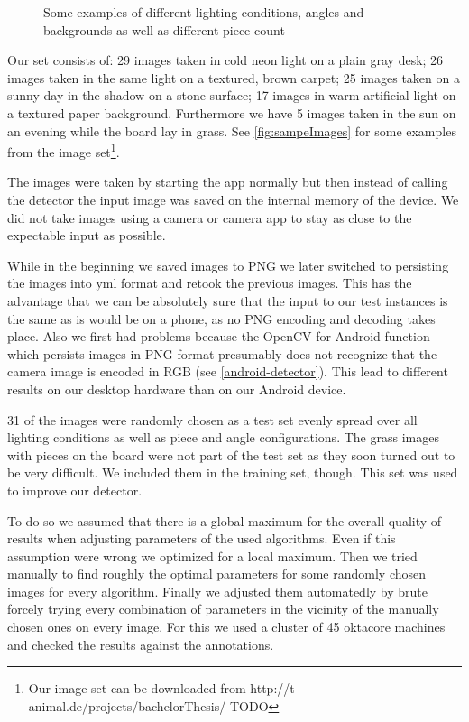 \begin{figure}
		\caption{Some examples of different lighting conditions, angles and backgrounds as well as different piece count}
		\label{fig:sampeImages}
	\end{figure}

	Our set consists of: 29 images taken in cold neon light on a plain gray desk; 26 images taken in the same light on a textured, brown carpet; 25 images taken on a sunny day in the shadow on a stone surface; 17 images in warm artificial light on a textured paper background. Furthermore we have 5 images taken in the sun on an evening while the board lay in grass. See \autoref{fig:sampeImages} for some examples from the image set\footnote{Our image set can be downloaded from http://t-animal.de/projects/bachelorThesis/ TODO}.

	The images were taken by starting the app normally but then instead of calling the detector the input image was saved on the internal memory of the device. We did not take images using a camera or camera app to stay as close to the expectable input as possible.

	While in the beginning we saved images to PNG we later switched to persisting the images into yml format and retook the previous images. This has the advantage that we can be absolutely sure that the input to our test instances is the same as is would be on a phone, as no PNG encoding and decoding takes place. Also we first had problems because the OpenCV for Android function which persists images in PNG format presumably does not recognize that the camera image is encoded in RGB (see \autoref{android-detector}). This lead to different results on our desktop hardware than on our Android device.

	31 of the images were randomly chosen as a test set evenly spread over all lighting conditions as well as piece and angle configurations. The grass images with pieces on the board were not part of the test set as they soon turned out to be very difficult. We included them in the training set, though. This set was used to improve our detector.

	To do so we assumed that there is a global maximum for the overall quality of results when adjusting parameters of the used algorithms. Even if this assumption were wrong we optimized for a local maximum. Then we tried manually to find roughly the optimal parameters for some randomly chosen images for every algorithm. Finally we adjusted them automatedly by brute forcely trying every combination of parameters in the vicinity of the manually chosen ones on every image. For this we used a cluster of 45 oktacore machines and checked the results against the annotations.






